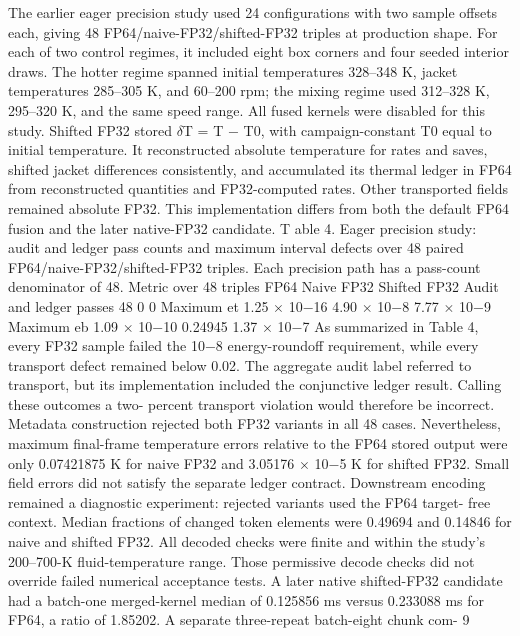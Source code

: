 \documentclass[11pt]{article}
\begin{document}
The earlier eager precision study used 24 configurations with two sample offsets each, giving 48
FP64/naive-FP32/shifted-FP32 triples at production shape. For each of two control regimes, it
included eight box corners and four seeded interior draws. The hotter regime spanned initial
temperatures 328–348 K, jacket temperatures 285–305 K, and 60–200 rpm; the mixing regime used
312–328 K, 295–320 K, and the same speed range. All fused kernels were disabled for this study.
Shifted FP32 stored \ensuremath{\delta}T = T \ensuremath{-} T0, with campaign-constant T0 equal to initial temperature.
It reconstructed absolute temperature for rates and saves, shifted jacket differences consistently,
and accumulated its thermal ledger in FP64 from reconstructed quantities and FP32-computed
rates. Other transported fields remained absolute FP32. This implementation differs from both
the default FP64 fusion and the later native-FP32 candidate.
T able 4. Eager precision study: audit and ledger pass counts and maximum interval defects over
48 paired FP64/naive-FP32/shifted-FP32 triples. Each precision path has a pass-count
denominator of 48.
Metric over 48 triples FP64 Naive FP32 Shifted FP32
Audit and ledger passes 48 0 0
Maximum et 1.25 \ensuremath{\times} 10\ensuremath{-}16 4.90 \ensuremath{\times} 10\ensuremath{-}8 7.77 \ensuremath{\times} 10\ensuremath{-}9
Maximum eb 1.09 \ensuremath{\times} 10\ensuremath{-}10 0.24945 1.37 \ensuremath{\times} 10\ensuremath{-}7
As summarized in Table 4, every FP32 sample failed the 10\ensuremath{-}8 energy-roundoff requirement,
while every transport defect remained below 0.02. The aggregate audit label referred to transport,
but its implementation included the conjunctive ledger result. Calling these outcomes a two-
percent transport violation would therefore be incorrect. Metadata construction rejected both
FP32 variants in all 48 cases. Nevertheless, maximum final-frame temperature errors relative to
the FP64 stored output were only 0.07421875 K for naive FP32 and 3.05176 \ensuremath{\times} 10\ensuremath{-}5 K for shifted
FP32. Small field errors did not satisfy the separate ledger contract.
Downstream encoding remained a diagnostic experiment: rejected variants used the FP64 target-
free context. Median fractions of changed token elements were 0.49694 and 0.14846 for naive and
shifted FP32. All decoded checks were finite and within the study’s 200–700-K fluid-temperature
range. Those permissive decode checks did not override failed numerical acceptance tests.
A later native shifted-FP32 candidate had a batch-one merged-kernel median of 0.125856 ms
versus 0.233088 ms for FP64, a ratio of 1.85202. A separate three-repeat batch-eight chunk com-
9
\end{document}

